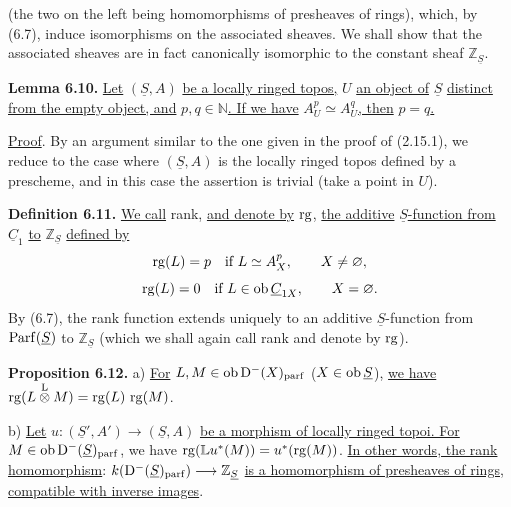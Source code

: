 %
(the two on the left being homomorphisms of presheaves of rings), which, by (6.7), induce isomorphisms on the associated sheaves. We shall show that the associated sheaves are in fact canonically isomorphic to the constant sheaf \(\mathbb Z_{\underline{S}}\).

\textbf{Lemma 6.10.} \uline{Let} \((\underline{S},A)\) \uline{be a locally ringed topos,} \(U\) \uline{an object of} \(\underline{S}\) \uline{distinct from the empty object, and} \(p,q\in\mathbb N\)\uline{. If we have} \(A_U^p\simeq A_U^q\)\uline{, then} \(p=q\)\uline{.}

\uline{Proof}. By an argument similar to the one given in the proof of (2.15.1), we reduce to the case where \((\underline{S},A)\) is the locally ringed topos defined by a prescheme, and in this case the assertion is trivial (take a point in \(U\)).

\textbf{Definition 6.11.} \uline{We call} rank, \uline{and denote by} \(\operatorname{rg}\), \uline{the additive} \(\underline{S}\)\uline{-function from} \(\underline{C}_1\) \uline{to} \(\mathbb Z_{\underline{S}}\) \uline{defined by}
\[
  \operatorname{rg}(L)=p\quad\text{if } L\simeq A_X^p,
  \qquad X\ne\varnothing,
\]
\[
  \operatorname{rg}(L)=0\quad\text{if } L\in\operatorname{ob}\underline{C}_{1X},
  \qquad X=\varnothing.
\]
By (6.7), the rank function extends uniquely to an additive \(\underline{S}\)-function from \(\operatorname{Parf}(\underline{S})\) to \(\mathbb Z_{\underline{S}}\) (which we shall again call rank and denote by \(\operatorname{rg}\)).

\textbf{Proposition 6.12.} a) \uline{For} \(L,M\in\operatorname{ob}\mathrm D^-(X)_{\mathrm{parf}}\) (\(X\in\operatorname{ob} \underline{S}\)), \uline{we have} \(\operatorname{rg}(L\overset{\mathrm L}{\otimes} M)=\operatorname{rg}(L)\,\operatorname{rg}(M)\).

b) \uline{Let} \(u:(\underline{S}',A')\longrightarrow(\underline{S},A)\) \uline{be a morphism of locally ringed topoi. For} \(M\in\operatorname{ob}\mathrm D^-(\underline{S})_{\mathrm{parf}}\), we have \(\operatorname{rg}(\mathbb L u^*(M))=u^*(\operatorname{rg}(M))\). \uline{In other words, the rank homomorphism}: \(k(\mathrm D^-(\underline{S})_{\mathrm{parf}})\longrightarrow \mathbb Z_{\underline{S}}\) \uline{is a homomorphism of presheaves of rings, compatible with inverse images}.

